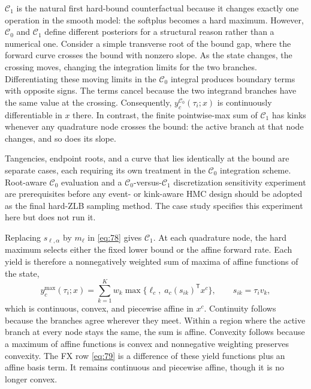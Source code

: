 \documentclass[11pt]{article}
\begin{document}
\(\mathcal C_1\) is the natural first hard-bound counterfactual because it changes exactly one operation in the smooth model: the softplus becomes a hard maximum. However, \(\mathcal C_0\) and \(\mathcal C_1\) define different posteriors for a structural reason rather than a numerical one. Consider a simple transverse root of the bound gap, where the forward curve crosses the bound with nonzero slope. As the state changes, the crossing moves, changing the integration limits for the two branches. Differentiating these moving limits in the \(\mathcal C_0\) integral produces boundary terms with opposite signs. The terms cancel because the two integrand branches have the same value at the crossing. Consequently, \(y_c^{\mathcal C_0}(\tau_i;x)\) is continuously differentiable in \(x\) there. In contrast, the finite pointwise-max sum of \(\mathcal C_1\) has kinks whenever any quadrature node crosses the bound: the active branch at that node changes, and so does its slope.

Tangencies, endpoint roots, and a curve that lies identically at the bound are separate cases, each requiring its own treatment in the \(\mathcal C_0\) integration scheme. Root-aware \(\mathcal C_0\) evaluation and a \(\mathcal C_0\)-versus-\(\mathcal C_1\) discretization sensitivity experiment are prerequisites before any event- or kink-aware HMC design should be adopted as the final hard-ZLB sampling method. The case study specifies this experiment here but does not run it.

Replacing \(s_{\ell,\alpha}\) by \(m_\ell\) in \eqref{eq:78} gives \(\mathcal C_1\). At each quadrature node, the hard maximum selects either the fixed lower bound or the affine forward rate. Each yield is therefore a nonnegatively weighted sum of maxima of affine functions of the state,
\begin{equation}\label{eq:81}
 y_c^{\max}(\tau_i;x)=\sum_{k=1}^{K}w_k
 \max\bigl\{\ell_c,\;a_c(s_{ik})^{\mathsf T}x^c\bigr\},
 \qquad s_{ik}=\tau_i v_k,
\end{equation}
which is continuous, convex, and piecewise affine in \(x^c\). Continuity follows because the branches agree wherever they meet. Within a region where the active branch at every node stays the same, the sum is affine. Convexity follows because a maximum of affine functions is convex and nonnegative weighting preserves convexity. The FX row \eqref{eq:79} is a difference of these yield functions plus an affine basis term. It remains continuous and piecewise affine, though it is no longer convex.
\end{document}
